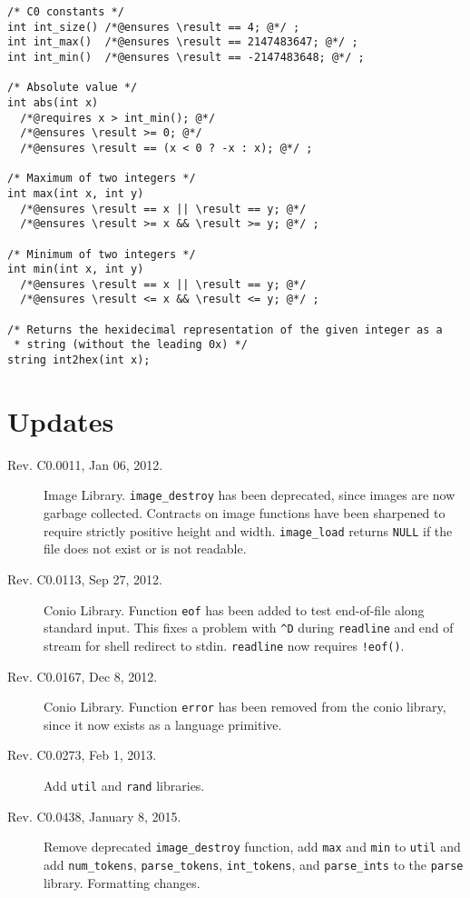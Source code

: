 \documentclass[11pt]{article}
\begin{document}
\begin{small}
\begin{verbatim}
/* C0 constants */
int int_size() /*@ensures \result == 4; @*/ ;
int int_max()  /*@ensures \result == 2147483647; @*/ ;
int int_min()  /*@ensures \result == -2147483648; @*/ ;

/* Absolute value */
int abs(int x)
  /*@requires x > int_min(); @*/
  /*@ensures \result >= 0; @*/
  /*@ensures \result == (x < 0 ? -x : x); @*/ ;

/* Maximum of two integers */
int max(int x, int y)
  /*@ensures \result == x || \result == y; @*/
  /*@ensures \result >= x && \result >= y; @*/ ;

/* Minimum of two integers */
int min(int x, int y)
  /*@ensures \result == x || \result == y; @*/ 
  /*@ensures \result <= x && \result <= y; @*/ ;

/* Returns the hexidecimal representation of the given integer as a
 * string (without the leading 0x) */ 
string int2hex(int x);
\end{verbatim}
\end{small}

\section{Updates}
\label{sec:updates}
\hypertarget{sec:updates}{}

\begin{description}
\item[Rev. C0.0011, Jan 06, 2012.]  Image Library.
  \verb'image_destroy' has been deprecated, since images are now
  garbage collected.  Contracts on image functions have been sharpened
  to require strictly positive height and width.  \verb'image_load'
  returns \verb'NULL' if the file does not exist or is not readable.
\item[Rev. C0.0113, Sep 27, 2012.]  Conio Library.
  Function \verb'eof' has been added to test end-of-file along
  standard input.  This fixes a problem with \verb'^D' during
  \verb'readline' and end of stream for shell redirect to stdin.
  \verb'readline' now requires \verb'!eof()'.
\item[Rev. C0.0167, Dec 8, 2012.]  Conio Library.
  Function \verb'error' has been removed from the conio library, since
  it now exists as a language primitive.
\item[Rev. C0.0273, Feb 1, 2013.]  Add \verb'util' and \verb'rand' libraries.
\item[Rev. C0.0438, January 8, 2015.]  Remove deprecated
  \verb'image_destroy' function, add \verb'max' and \verb'min' to
  \verb'util' and add \verb'num_tokens', \verb'parse_tokens',
  \verb'int_tokens', and \verb'parse_ints' to the \verb'parse'
  library. Formatting changes.
\end{description}
\end{document}
